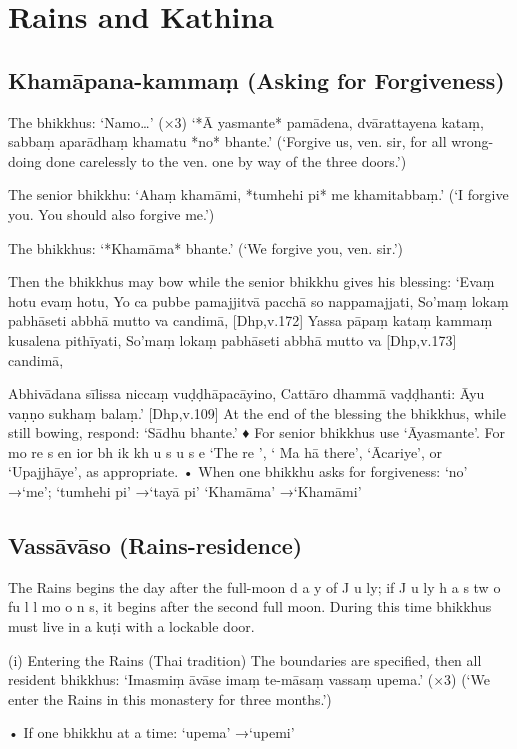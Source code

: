 \chapter{Rains and Kathina}

\section{Khamāpana-kammaṃ (Asking for Forgiveness)}

The bhikkhus: ‘Namo…’ (×3)
‘*Ā yasmante* pamādena,
dvārattayena kataṃ,
sabbaṃ aparādhaṃ khamatu *no* bhante.’
(‘Forgive us, ven. sir, for all wrong-doing done
carelessly to the ven. one by way of the three doors.’)

The senior bhikkhu:
‘Ahaṃ khamāmi,
*tumhehi pi* me khamitabbaṃ.’
(‘I forgive you. You should also forgive me.’)

The bhikkhus: ‘*Khamāma* bhante.’
(‘We forgive you, ven. sir.’)

Then the bhikkhus may bow while the senior
bhikkhu gives his blessing:
‘Evaṃ hotu evaṃ hotu,
Yo ca pubbe pamajjitvā pacchā so nappamajjati,
So'maṃ lokaṃ pabhāseti abbhā mutto va
candimā,
[Dhp,v.172]
Yassa pāpaṃ kataṃ kammaṃ kusalena pithīyati,
So'maṃ lokaṃ pabhāseti abbhā mutto va
[Dhp,v.173]
candimā,

Abhivādana sīlissa niccaṃ vuḍḍhāpacāyino,
Cattāro dhammā vaḍḍhanti:
Āyu vaṇṇo sukhaṃ balaṃ.’ [Dhp,v.109]
At the end of the blessing the bhikkhus, while
still bowing, respond: ‘Sādhu bhante.’
♦ For senior bhikkhus use ‘Āyasmante’. For
mo re s en ior bh ik kh u s u s e ‘The re ’, ‘ Ma hā there’, ‘Ācariye’, or ‘Upajjhāye’, as appropriate.
• When one bhikkhu asks for forgiveness:
‘no’ →‘me’; ‘tumhehi pi’ →‘tayā pi’
‘Khamāma’ →‘Khamāmi’

\section{Vassāvāso (Rains-residence)}

The Rains begins the day after the full-moon
d a y of J u ly; if J u ly h a s tw o fu l l mo o n s, it
begins after the second full moon. During this
time bhikkhus must live in a kuṭi with a lockable door.

(i) Entering the Rains (Thai tradition)
The boundaries are specified, then all resident
bhikkhus:
‘Imasmiṃ āvāse
imaṃ te-māsaṃ vassaṃ upema.’ (×3)
(‘We enter the Rains in this monastery
for three months.’)

• If one bhikkhu at a time: ‘upema’ →‘upemi’

